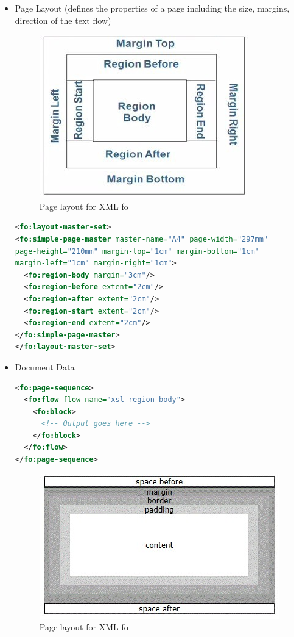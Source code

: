 \begin{itemize}
\item Page Layout (defines the properties of a page including the size, margins, direction of the text flow) 
\begin{figure}
\label{fig:layoutxmlfo}
\caption{Page layout for XML fo}
\includegraphics[origin=c]{images/layoutxmlfo.jpg}
\end{figure}
\begin{lstlisting}[language=xml]
<fo:layout-master-set>
<fo:simple-page-master master-name="A4" page-width="297mm"
page-height="210mm" margin-top="1cm" margin-bottom="1cm"
margin-left="1cm" margin-right="1cm">
  <fo:region-body margin="3cm"/>
  <fo:region-before extent="2cm"/>
  <fo:region-after extent="2cm"/>
  <fo:region-start extent="2cm"/>
  <fo:region-end extent="2cm"/>
</fo:simple-page-master>
</fo:layout-master-set>
\end{lstlisting}
\item Document Data
\begin{lstlisting}[language=xml]
<fo:page-sequence>
  <fo:flow flow-name="xsl-region-body">
    <fo:block>
      <!-- Output goes here -->
    </fo:block>
  </fo:flow>
</fo:page-sequence>
\end{lstlisting}
\begin{figure}[h]
\label{fig:fo2}
\caption{Page layout for XML fo}
\includegraphics[origin=c]{images/fo2.jpg}
\end{figure}
\end{itemize}
